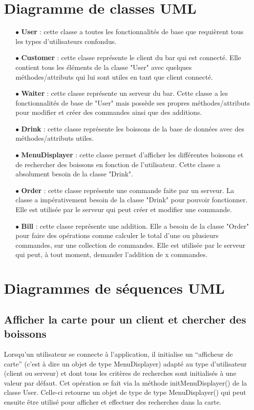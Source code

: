 


\section{Diagramme de classes UML}
\begin{itemize}
	\item[{$\bullet$}] \textbf{User} : cette classe a toutes les fonctionnalités de base que requièrent
	tous les types d'utilisateurs confondus.
	\item[{$\bullet$}] \textbf{Customer} : cette classe représente le client du bar qui est connecté.
	Elle contient tous les éléments de la classe "User" avec quelques méthodes/attributs qui lui sont utiles
	en tant que client connecté.
	\item[{$\bullet$}] \textbf{Waiter} : cette classe représente un serveur du bar. Cette classe a les
	fonctionnalités de base de "User" mais possède ses propres méthodes/attributs pour modifier et créer
	des commandes ainsi que des additions.
	\item[{$\bullet$}] \textbf{Drink} : cette classe représente les boissons de la base de données avec
	des méthodes/attributs utiles. 
	\item[{$\bullet$}] \textbf{MenuDisplayer} : cette classe permet d'afficher les
	différentes boissons et de rechercher des boissons en fonction de l'utilisateur. Cette classe a
	absolument besoin de la classe "Drink".
	\item[{$\bullet$}] \textbf{Order} : cette classe représente une commande faite par un serveur. La
	classe a impérativement besoin de la classe "Drink" pour pouvoir fonctionner. Elle est utilisée par
	le serveur qui peut créer et modifier une commande.
	\item[{$\bullet$}] \textbf{Bill} : cette classe représente une addition. Elle a besoin de
	la classe "Order" pour faire des opérations comme calculer le total d'une ou plusieurs
	commandes, sur une collection de commandes. Elle est utilisée par le serveur qui peut, à tout moment,
	demander l'addition de x commandes.
\end{itemize}
\section{Diagrammes de séquences UML}
\subsection{Afficher la carte pour un client et chercher des boissons}
Lorsqu'un utilisateur se connecte à l'application, il initialise un ``afficheur
de carte'' (c'est à dire un objet de type MenuDisplayer) adapté au type
d'utilisateur (client ou serveur) et dont tous les critères de recherches
sont initialisés à une valeur par défaut. Cet opération se fait via la méthode
initMenuDisplayer() de la classe User. Celle-ci retourne un objet de type
de type MenuDisplayer() qui peut ensuite être utilisé pour afficher et effectuer
des recherches dans la carte.

